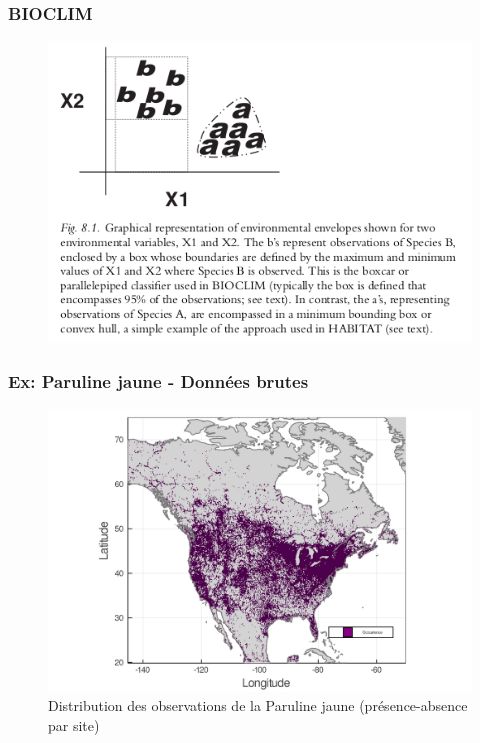 \documentclass[10pt]{beamer}
\begin{document}
\begin{frame}
  \frametitle{BIOCLIM}
  \begin{figure}
    \centering
    \hspace*{-0cm}\includegraphics[scale=0.5]{fig/bioclim-with-caption.png}
  \end{figure}
\end{frame}

\begin{frame}
  \frametitle{Ex: Paruline jaune - Données brutes}
  \begin{figure}
    \centering
    \hspace*{-0cm}\includegraphics[scale=0.17]{fig/01_raw_singlesp.png}
    \caption{Distribution des observations de la Paruline jaune (présence-absence par site)}
  \end{figure}
\end{frame}
\end{document}
